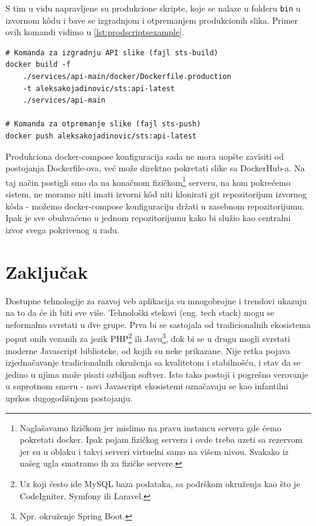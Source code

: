 \documentclass[12pt,oneside]{memoir}
\begin{document}
S tim u vidu napravljene su produkcione skripte, koje se nalaze u folderu \verb|bin| u izvornom k\^{o}du i bave se izgradnjom i otpremanjem produkcionih slika. Primer ovih komandi vidimo u \ref{lst:prodscriptsexample}.

\begin{lstlisting}[caption={docker-compose komande.}, label={lst:prodscriptsexample}]
# Komanda za izgradnju API slike (fajl sts-build)
docker build -f 
    ./services/api-main/docker/Dockerfile.production 
    -t aleksakojadinovic/sts:api-latest 
    ./services/api-main

# Komanda za otpremanje slike (fajl sts-push)
docker push aleksakojadinovic/sts:api-latest

\end{lstlisting}

Produkciona docker-compose konfiguracija sada ne mora uopšte zavisiti od postojanja Dockerfile-ova, već može direktno pokretati slike sa DockerHub-a. Na taj način postigli smo da na konačnom fizičkom\footnote{Naglašavamo fizičkom jer mislimo na pravu instancu servera gde ćemo pokretati docker. Ipak pojam fizičkog servera i ovde treba uzeti sa rezervom jer su u oblaku i takvi serveri virtuelni samo na višem nivou. Svakako iz našeg ugla smatramo ih za fizičke servere.} serveru, na kom pokrećemo sistem, ne moramo niti imati izvorni k\^{o}d niti klonirati git repozitorijum izvornog k\^{o}da - možemo docker-compose konfiguraciju držati u zasebnom repozitorijumu. Ipak je sve obuhvaćeno u jednom repozitorijumu kako bi služio kao centralni izvor svega pokrivenog u radu.


\chapter{Zaključak}

Dostupne tehnologije za razvoj veb aplikacija su mnogobrojne i trendovi ukazuju na to da će ih biti sve više. Tehnološki stekovi (eng. tech stack) mogu se neformalno svrstati u dve grupe. Prva bi se sastojala od tradicionalnih ekosistema poput onih vezanih za jezik PHP\footnote{Uz koji često ide MySQL baza podataka, sa podrškom okruženja kao što je CodeIgniter, Symfony ili Laravel.} ili Javu\footnote{Npr. okruženje Spring Boot.}, dok bi se u drugu mogli svrstati moderne Javascript biblioteke, od kojih su neke prikazane. Nije retka pojava izjednačavanje tradicionalnih okruženja sa kvalitetom i stabilnošću, i stav da se jedino u njima može pisati ozbiljan softver. Isto tako postoji i pogrešno verovanje u suprotnom smeru - novi Javascript ekosistemi označavaju se kao infantilni uprkos dugogodišnjem postojanju.
\end{document}
